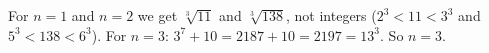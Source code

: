 For $n=1$ and $n=2$ we get $\sqrt[3]{11}$ and $\sqrt[3]{138}$, not integers ($2^3<11<3^3$ and $5^3<138<6^3$). For $n=3$: $3^7+10=2187+10=2197=13^3$. So $n=\boxed{3}$.
